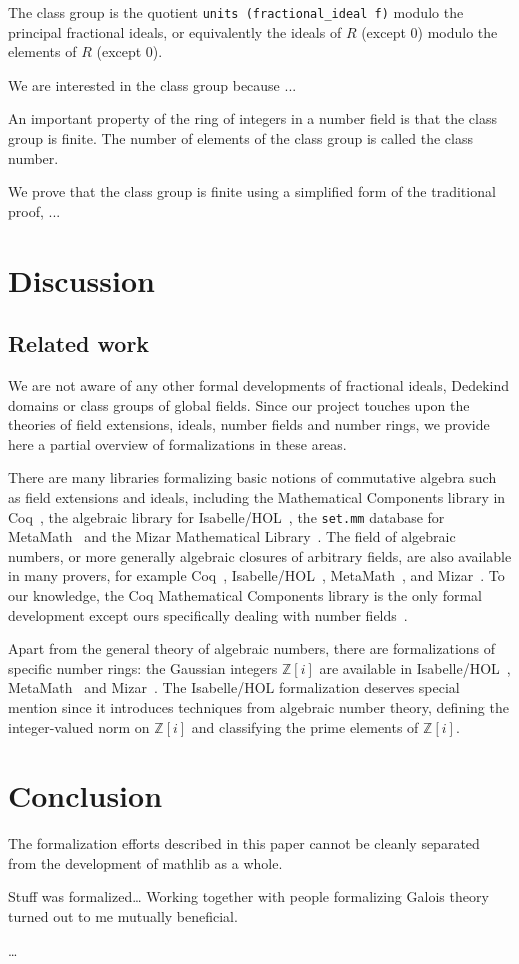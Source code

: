 \documentclass[a4paper,USenglish,cleveref, autoref, thm-restate]{lipics-v2021}
\newcommand{\lean}[1]{\texttt{#1}\xspace} %
\newcommand{\mathlib}{\textsf{mathlib}\xspace}
\newcommand{\Z}{\mathbb{Z}}
\begin{document}
The class group is the quotient \lean{units (fractional\_ideal f)} modulo the principal fractional ideals, or equivalently the ideals of $R$ (except $0$) modulo the elements of $R$ (except $0$).

We are interested in the class group because ...

An important property of the ring of integers in a number field is that the class group is finite. The number of elements of the class group is called the class number.

We prove that the class group is finite using a simplified form of the traditional proof, ...

\section{Discussion}

\subsection{Related work}

We are not aware of any other formal developments of fractional ideals, Dedekind domains or class groups of global fields.
Since our project touches upon the theories of field extensions, ideals, number fields and number rings,
we provide here a partial overview of formalizations in these areas.

There are many libraries formalizing basic notions of commutative algebra such as field extensions and ideals, including the Mathematical Components library in Coq~\cite{mathcomp}, the algebraic library for Isabelle/HOL~\cite{algebra_isabelle}, the \texttt{set.mm} database for MetaMath~\cite{metamath} and the Mizar Mathematical Library~\cite{algebraic-hierarchy_mizar}. The field of algebraic numbers, or more generally algebraic closures of arbitrary fields, are also available in many provers, for example Coq~\cite{real-algebraic-numbers-coq, mathcomp}, Isabelle/HOL~\cite{algebraic-numbers-isabelle}, MetaMath~\cite{algebraic-numbers-metamath}, and Mizar~\cite{algebraic-numbers-mizar}. To our knowledge, the Coq Mathematical Components library is the only formal development except ours specifically dealing with number fields~\cite[\texttt{field/algnum.v}]{mathcomp}.

Apart from the general theory of algebraic numbers, there are formalizations of specific number rings: the Gaussian integers $\Z[i]$ are available in Isabelle/HOL~\cite{gaussian_integers-isabelle}, MetaMath~\cite{gaussian_integers-metamath} and Mizar~\cite{gaussian_integers-mizar}.
The Isabelle/HOL formalization deserves special mention since it introduces techniques from algebraic number theory,
defining the integer-valued norm on $\Z[i]$ and classifying the prime elements of $\Z[i]$.

\section{Conclusion}

The formalization efforts described in this paper cannot be cleanly separated from the development of \mathlib as a whole.

Stuff was formalized\ldots
Working together with people formalizing Galois theory turned out to me mutually beneficial.

\ldots
 



\end{document}
